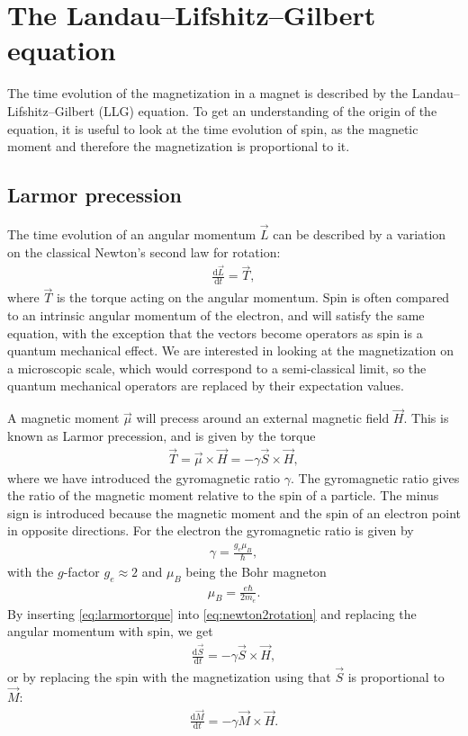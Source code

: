 \documentclass[12pt, a4paper, twoside, openright]{article}		%
\let\oldsection\section
\def\section{\cleardoublepage\oldsection}
\numberwithin{equation}{section}
\begin{document}
\section{The Landau--Lifshitz--Gilbert equation} \label{sec:LLG}
The time evolution of the magnetization in a magnet is described by the Landau--Lifshitz--Gilbert (LLG) equation. To get an understanding of the origin of the equation, it is useful to look at the time evolution of spin, as the magnetic moment and therefore the magnetization is proportional to it. 

\subsection{Larmor precession}
The time evolution of an angular momentum $\vec{L}$ can be described by a variation on the classical Newton's second law for rotation:
\begin{align}
\label{eq:newton2rotation}
\frac{\textrm{d} \vec{L}}{\textrm{d} t} = \vec{T},
\end{align}
where $\vec{T}$ is the torque acting on the angular momentum. Spin is often compared to an intrinsic angular momentum of the electron, and will satisfy the same equation, with the exception that the vectors become operators as spin is a quantum mechanical effect. We are interested in looking at the magnetization on a microscopic scale, which would correspond to a semi-classical limit, so the quantum mechanical operators are replaced by their expectation values. 

A magnetic moment $\vec{\mu}$ will precess around an external magnetic field $\vec{H}$. This is known as Larmor precession, and is given by the torque
\begin{align}
\label{eq:larmortorque}
\vec{T} = \vec{\mu} \times \vec{H} = -\gamma \vec{S} \times \vec{H},
\end{align}
where we have introduced the gyromagnetic ratio $\gamma$. The gyromagnetic ratio gives the ratio of the magnetic moment relative to the spin of a particle. The minus sign is introduced because the magnetic moment and the spin of an electron point in opposite directions. For the electron the gyromagnetic ratio is given by
\begin{align}
\gamma = \frac{g_e\mu_B}{\hbar},
\end{align}
with the $g$-factor $g_e \approx 2$ and $\mu_B$ being the Bohr magneton
\begin{align}
\mu_B = \frac{e\hbar}{2m_e}.
\end{align}
By inserting \eqref{eq:larmortorque} into \eqref{eq:newton2rotation} and replacing the angular momentum with spin, we get
\begin{align}
\frac{\textrm{d} \vec{S}}{\textrm{d} t} =- \gamma \vec{S} \times \vec{H},
\end{align}
or by replacing the spin with the magnetization using that $\vec{S}$ is proportional to $\vec{M}$:
\begin{align}
\label{eq:mag_undamped}
\frac{\textrm{d} \vec{M}}{\textrm{d} t} = -\gamma \vec{M} \times \vec{H}.
\end{align}
\end{document}
